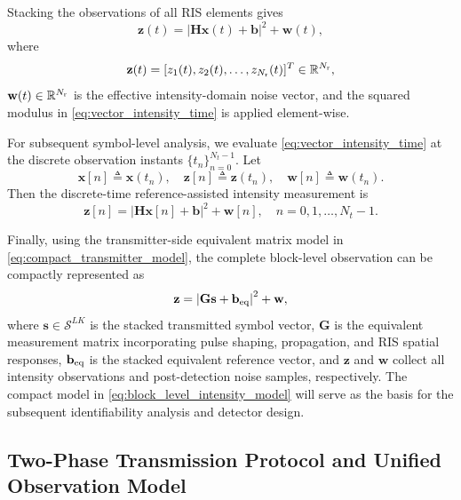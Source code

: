 \documentclass[journal]{IEEEtran}
\begin{document}
Stacking the observations of all RIS elements gives
\begin{equation}
\mathbf{z}(t)
=
\left|
\mathbf{H}\mathbf{x}(t)+\mathbf{b}
\right|^2
+
\mathbf{w}(t),
\label{eq:vector_intensity_time}
\end{equation}
where 
\begin{equation}
\mathbf{z}(t)
=
[z_1(t),z_2(t),\ldots,z_{N_{\rm r}}(t)]^T
\in\mathbb{R}^{N_{\rm r}},
\end{equation}
\(\mathbf{w}(t)\in\mathbb{R}^{N_{\rm r}}\) is the effective intensity-domain noise vector, and the squared modulus in \eqref{eq:vector_intensity_time} is applied element-wise.

For subsequent symbol-level analysis, we evaluate \eqref{eq:vector_intensity_time} at the discrete observation instants $\{t_n\}_{n=0}^{N_t-1}$. 
Let
\begin{equation}
\mathbf{x}[n]\triangleq \mathbf{x}(t_n),
\quad
\mathbf{z}[n]\triangleq \mathbf{z}(t_n),
\quad
\mathbf{w}[n]\triangleq \mathbf{w}(t_n).
\end{equation}
Then the discrete-time reference-assisted intensity measurement is
\begin{equation}
\mathbf{z}[n]
=
\left|
\mathbf{H}\mathbf{x}[n]+\mathbf{b}
\right|^2
+
\mathbf{w}[n],
\quad
n=0,1,\ldots,N_t-1.
\label{eq:discrete_intensity_measurement}
\end{equation}

Finally, using the transmitter-side equivalent matrix model in \eqref{eq:compact_transmitter_model}, the complete block-level observation can be compactly represented as
\begin{equation}
\mathbf{z}
=
\left|
\mathbf{G}\mathbf{s}
+
\mathbf{b}_{\rm eq}
\right|^2
+
\mathbf{w},
\label{eq:block_level_intensity_model}
\end{equation}
where $\mathbf{s}\in\mathcal{S}^{LK}$ is the stacked transmitted symbol vector, $\mathbf{G}$ is the equivalent measurement matrix incorporating pulse shaping, propagation, and RIS spatial responses, $\mathbf{b}_{\rm eq}$ is the stacked equivalent reference vector, and $\mathbf{z}$ and $\mathbf{w}$ collect all intensity observations and post-detection noise samples, respectively. 
The compact model in \eqref{eq:block_level_intensity_model} will serve as the basis for the subsequent identifiability analysis and detector design.

\subsection{Two-Phase Transmission Protocol and Unified Observation Model}
\end{document}
